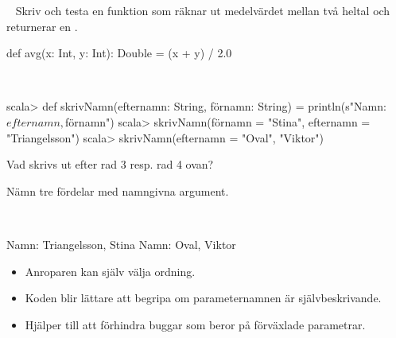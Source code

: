 \SubtaskSolved  {}

\QUESTEND




\QUESTBEGIN

\Task  \what~ Skriv och testa en funktion  som räknar ut medelvärdet mellan två heltal och returnerar en .

\SOLUTION

\TaskSolved \what

\begin{Code}
def avg(x: Int, y: Int): Double = (x + y) / 2.0
\end{Code}

\QUESTEND





\QUESTBEGIN

\Task  \what~
\begin{REPL}
scala> def skrivNamn(efternamn: String, förnamn: String) =
         println(s"Namn: $efternamn, $förnamn")
scala> skrivNamn(förnamn = "Stina", efternamn = "Triangelsson")
scala> skrivNamn(efternamn = "Oval", "Viktor")

\end{REPL}

\Subtask Vad skrivs ut efter rad 3 resp. rad 4 ovan?

\Subtask Nämn tre fördelar med namngivna argument.

\SOLUTION

\TaskSolved \what~

\SubtaskSolved
\begin{REPL}
Namn: Triangelsson, Stina
Namn: Oval, Viktor
\end{REPL}

\SubtaskSolved
\begin{itemize}
  \item Anroparen kan själv välja ordning.
  \item Koden blir lättare att begripa om parameternamnen är självbeskrivande.
  \item Hjälper till att förhindra buggar som beror på förväxlade parametrar.
\end{itemize}

\QUESTEND





\QUESTBEGIN


